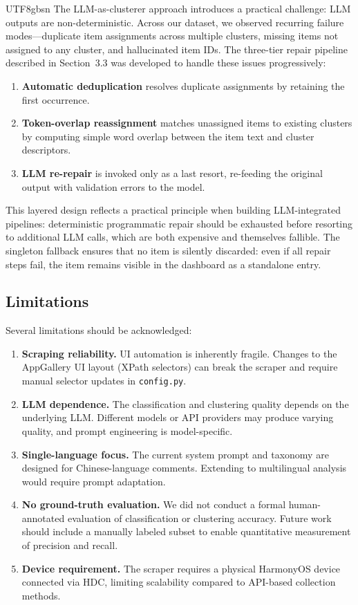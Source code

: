 \documentclass[11pt,a4paper]{article}
\begin{document}
\begin{CJK*}{UTF8}{gbsn}
The LLM-as-clusterer approach introduces a practical challenge: LLM outputs are non-deterministic. Across our dataset, we observed recurring failure modes---duplicate item assignments across multiple clusters, missing items not assigned to any cluster, and hallucinated item IDs. The three-tier repair pipeline described in Section~3.3 was developed to handle these issues progressively:

\begin{enumerate}[nosep]
  \item \textbf{Automatic deduplication} resolves duplicate assignments by retaining the first occurrence.
  \item \textbf{Token-overlap reassignment} matches unassigned items to existing clusters by computing simple word overlap between the item text and cluster descriptors.
  \item \textbf{LLM re-repair} is invoked only as a last resort, re-feeding the original output with validation errors to the model.
\end{enumerate}

This layered design reflects a practical principle when building LLM-integrated pipelines: deterministic programmatic repair should be exhausted before resorting to additional LLM calls, which are both expensive and themselves fallible. The singleton fallback ensures that no item is silently discarded: even if all repair steps fail, the item remains visible in the dashboard as a standalone entry.

\subsection{Limitations}

Several limitations should be acknowledged:

\begin{enumerate}[nosep]
  \item \textbf{Scraping reliability.} UI automation is inherently fragile. Changes to the AppGallery UI layout (XPath selectors) can break the scraper and require manual selector updates in \texttt{config.py}.
  \item \textbf{LLM dependence.} The classification and clustering quality depends on the underlying LLM. Different models or API providers may produce varying quality, and prompt engineering is model-specific.
  \item \textbf{Single-language focus.} The current system prompt and taxonomy are designed for Chinese-language comments. Extending to multilingual analysis would require prompt adaptation.
  \item \textbf{No ground-truth evaluation.} We did not conduct a formal human-annotated evaluation of classification or clustering accuracy. Future work should include a manually labeled subset to enable quantitative measurement of precision and recall.
  \item \textbf{Device requirement.} The scraper requires a physical HarmonyOS device connected via HDC, limiting scalability compared to API-based collection methods.
\end{enumerate}



\end{CJK*}
\end{document}
